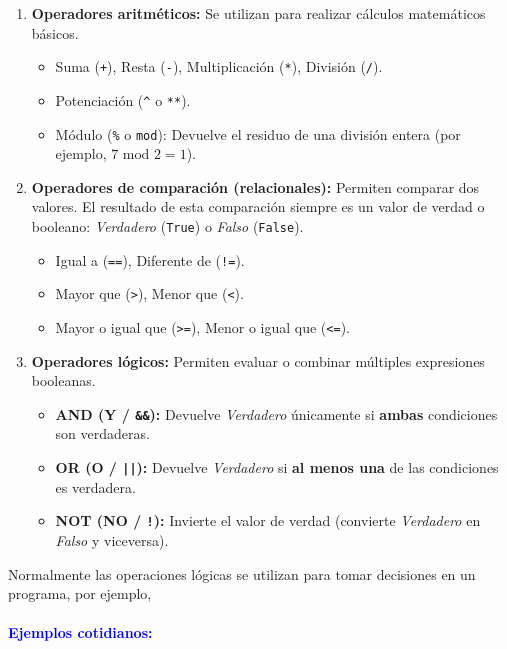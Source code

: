 \documentclass[12pt]{article}
\begin{document}
\begin{enumerate}[label=\textbf{\alph*)}]
    \item \textbf{Operadores aritméticos:} Se utilizan para realizar cálculos matemáticos básicos.
    \begin{itemize}
        \item Suma (\texttt{+}), Resta (\texttt{-}), Multiplicación (\texttt{*}), División (\texttt{/}).
        \item Potenciación (\texttt{\^{}} o \texttt{**}).
        \item Módulo (\texttt{\%} o \texttt{mod}): Devuelve el residuo de una división entera (por ejemplo, $7 \text{ mod } 2 = 1$).
    \end{itemize}

    \item \textbf{Operadores de comparación (relacionales):} Permiten comparar dos valores. El resultado de esta comparación siempre es un valor de verdad o booleano: \textit{Verdadero} (\texttt{True}) o \textit{Falso} (\texttt{False}).
    \begin{itemize}
        \item Igual a (\texttt{==}), Diferente de (\texttt{!=}).
        \item Mayor que (\texttt{>}), Menor que (\texttt{<}).
        \item Mayor o igual que (\texttt{>=}), Menor o igual que (\texttt{<=}).
    \end{itemize}

    \item \textbf{Operadores lógicos:} Permiten evaluar o combinar múltiples expresiones booleanas.
    \begin{itemize}
        \item \textbf{AND (Y / \texttt{\&\&}):} Devuelve \textit{Verdadero} únicamente si \textbf{ambas} condiciones son verdaderas.
        \item \textbf{OR (O / \texttt{||}):} Devuelve \textit{Verdadero} si \textbf{al menos una} de las condiciones es verdadera.
        \item \textbf{NOT (NO / \texttt{!}):} Invierte el valor de verdad (convierte \textit{Verdadero} en \textit{Falso} y viceversa).
    \end{itemize}
\end{enumerate}
Normalmente las operaciones lógicas se utilizan para tomar decisiones en un programa, 
por ejemplo,
\paragraph{\textcolor{blue}{Ejemplos cotidianos:}}
\end{document}
